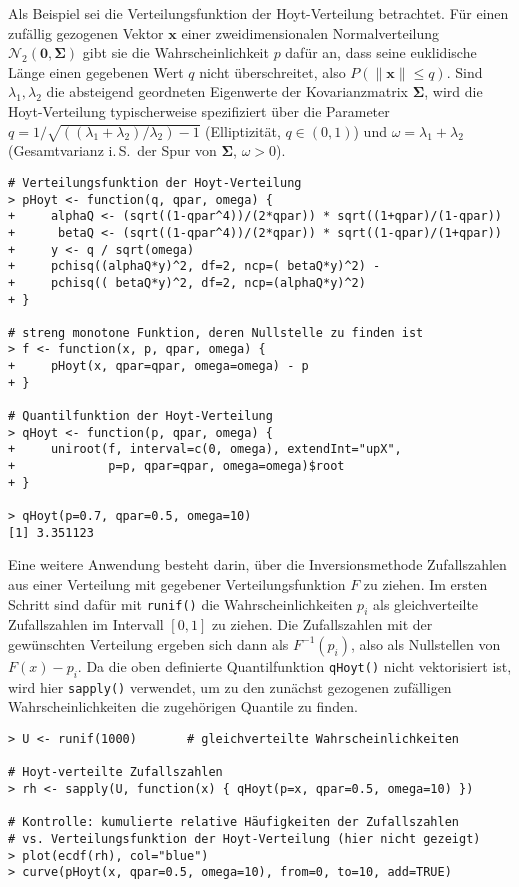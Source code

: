 Als Beispiel sei die Verteilungsfunktion der Hoyt-Verteilung betrachtet. Für einen zufällig gezogenen Vektor $\bm{x}$ einer zweidimensionalen Normalverteilung $\mathcal{N}_{2}(\bm{0}, \bm{\Sigma})$ gibt sie die Wahrscheinlichkeit $p$ dafür an, dass seine euklidische Länge einen gegebenen Wert $q$ nicht überschreitet, also $P(\|\bm{x}\| \leq q)$. Sind $\lambda_{1}, \lambda_{2}$ die absteigend geordneten Eigenwerte der Kovarianzmatrix $\bm{\Sigma}$, wird die Hoyt-Verteilung typischerweise spezifiziert über die Parameter $q = 1 / \sqrt{((\lambda_{1}+\lambda_{2}) / \lambda_{2}) - 1}$ (Elliptizität, $q \in (0, 1)$) und $\omega = \lambda_{1}+\lambda_{2}$ (Gesamtvarianz i.\,S.\ der Spur von $\bm{\Sigma}$, $\omega > 0$).
\begin{lstlisting}
# Verteilungsfunktion der Hoyt-Verteilung
> pHoyt <- function(q, qpar, omega) {
+     alphaQ <- (sqrt((1-qpar^4))/(2*qpar)) * sqrt((1+qpar)/(1-qpar))
+      betaQ <- (sqrt((1-qpar^4))/(2*qpar)) * sqrt((1-qpar)/(1+qpar))
+     y <- q / sqrt(omega)
+     pchisq((alphaQ*y)^2, df=2, ncp=( betaQ*y)^2) -
+     pchisq(( betaQ*y)^2, df=2, ncp=(alphaQ*y)^2)
+ }

# streng monotone Funktion, deren Nullstelle zu finden ist
> f <- function(x, p, qpar, omega) {
+     pHoyt(x, qpar=qpar, omega=omega) - p
+ }

# Quantilfunktion der Hoyt-Verteilung
> qHoyt <- function(p, qpar, omega) {
+     uniroot(f, interval=c(0, omega), extendInt="upX",
+             p=p, qpar=qpar, omega=omega)$root
+ }

> qHoyt(p=0.7, qpar=0.5, omega=10)
[1] 3.351123
\end{lstlisting}

Eine weitere Anwendung besteht darin, über die Inversionsmethode Zufallszahlen aus einer Verteilung mit gegebener Verteilungsfunktion $F$ zu ziehen. Im ersten Schritt sind dafür mit \lstinline!runif()! die Wahrscheinlichkeiten $p_{i}$ als gleichverteilte Zufallszahlen im Intervall $[0, 1]$ zu ziehen. Die Zufallszahlen mit der gewünschten Verteilung ergeben sich dann als $F^{-1}(p_{i})$, also als Nullstellen von $F(x) - p_{i}$. Da die oben definierte Quantilfunktion \lstinline!qHoyt()! nicht vektorisiert ist, wird hier \lstinline!sapply()! verwendet, um zu den zunächst gezogenen zufälligen Wahrscheinlichkeiten die zugehörigen Quantile zu finden.
\begin{lstlisting}
> U <- runif(1000)       # gleichverteilte Wahrscheinlichkeiten

# Hoyt-verteilte Zufallszahlen
> rh <- sapply(U, function(x) { qHoyt(p=x, qpar=0.5, omega=10) })

# Kontrolle: kumulierte relative Häufigkeiten der Zufallszahlen
# vs. Verteilungsfunktion der Hoyt-Verteilung (hier nicht gezeigt)
> plot(ecdf(rh), col="blue")
> curve(pHoyt(x, qpar=0.5, omega=10), from=0, to=10, add=TRUE)
\end{lstlisting}

